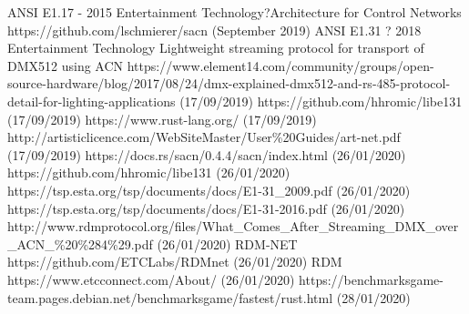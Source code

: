 \documentclass[11pt,a4paper,notitlepage]{report}
\begin{document}
	\begin{thebibliography}{9}
		ANSI E1.17 - 2015 Entertainment Technology?Architecture for Control Networks
		https://github.com/lschmierer/sacn (September 2019)
		ANSI E1.31 ? 2018 Entertainment Technology Lightweight streaming protocol for transport of DMX512 using ACN
		https://www.element14.com/community/groups/open-source-hardware/blog/2017/08/24/dmx-explained-dmx512-and-rs-485-protocol-detail-for-lighting-applications (17/09/2019)
		https://github.com/hhromic/libe131 (17/09/2019)
		https://www.rust-lang.org/ (17/09/2019)
		http://artisticlicence.com/WebSiteMaster/User\%20Guides/art-net.pdf (17/09/2019)
		https://docs.rs/sacn/0.4.4/sacn/index.html
		(26/01/2020)
		https://github.com/hhromic/libe131
		(26/01/2020)
		https://tsp.esta.org/tsp/documents/docs/E1-31\_2009.pdf
		(26/01/2020)
		https://tsp.esta.org/tsp/documents/docs/E1-31-2016.pdf
		(26/01/2020)
		http://www.rdmprotocol.org/files/What\_Comes\_After\_Streaming\_DMX\_over\_ACN\_\%20\%284\%29.pdf (26/01/2020)
		RDM-NET
		https://github.com/ETCLabs/RDMnet (26/01/2020)
		RDM
		https://www.etcconnect.com/About/ (26/01/2020)
		https://benchmarksgame-team.pages.debian.net/benchmarksgame/fastest/rust.html (28/01/2020)
		
	\end{thebibliography}
	
\end{document}
